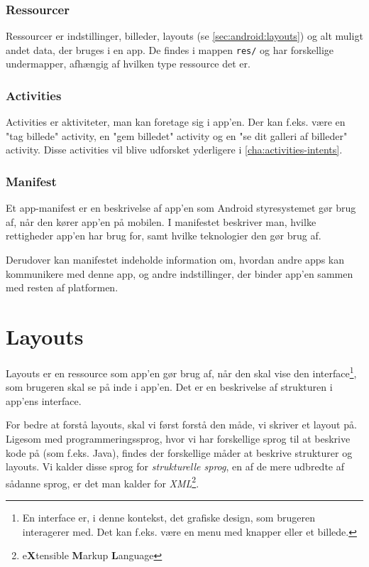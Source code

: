 \subsubsection{Ressourcer}
Ressourcer er indstillinger, billeder, layouts (se \autoref{sec:android:layouts}) og alt muligt andet data, der bruges i en app. De findes i mappen \texttt{res/} og har forskellige undermapper, afhængig af hvilken type ressource det er.

\subsubsection{Activities}
Activities er aktiviteter, man kan foretage sig i app'en. Der kan f.eks. være en "tag billede" activity, en "gem billedet" activity og en "se dit galleri af billeder" activity. Disse activities vil blive udforsket yderligere i \autoref{cha:activities-intents}.

\subsubsection{Manifest}
Et app-manifest er en beskrivelse af app'en som Android styresystemet gør brug af, når den kører app'en på mobilen. I manifestet beskriver man, hvilke rettigheder app'en har brug for, samt hvilke teknologier den gør brug af.

Derudover kan manifestet indeholde information om, hvordan andre apps kan kommunikere med denne app, og andre indstillinger, der binder app'en sammen med resten af platformen.

\section{Layouts}
\label{sec:android:layouts}

Layouts er en ressource som app'en gør brug af, når den skal vise den 
\gls{interface}\footnote{En \gls{interface} er, i denne kontekst, det grafiske 
design, som brugeren interagerer med. Det kan f.eks. være en menu med knapper 
eller et billede.}, som brugeren skal se på inde i app'en. Det er en beskrivelse 
af strukturen i app'ens \gls{interface}.

For bedre at forstå layouts, skal vi først forstå den måde, vi skriver et layout på. Ligesom med programmeringssprog, hvor vi har forskellige sprog til at beskrive kode på (som f.eks. Java), findes der forskellige måder at beskrive strukturer og layouts. Vi kalder disse sprog for \textit{strukturelle sprog}, en af de mere udbredte af sådanne sprog, er det man kalder for \textit{XML}\footnote{e\textbf{X}tensible \textbf{M}arkup \textbf{L}anguage}.

